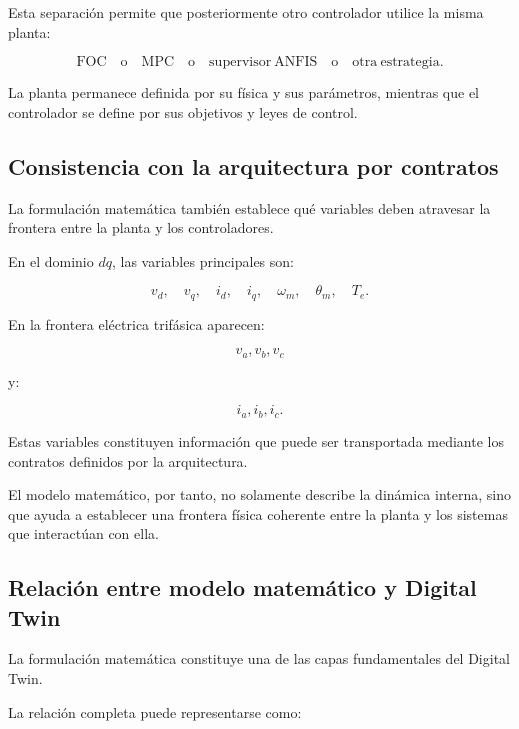 Esta separación permite que posteriormente otro controlador utilice la misma planta:

\begin{equation}
\mathrm{FOC}
\quad\text{o}\quad
\mathrm{MPC}
\quad\text{o}\quad
\mathrm{supervisor\ ANFIS}
\quad\text{o}\quad
\mathrm{otra\ estrategia}.
\end{equation}

La planta permanece definida por su física y sus parámetros, mientras que el controlador se define por sus objetivos y leyes de control.

\subsection{Consistencia con la arquitectura por contratos}

La formulación matemática también establece qué variables deben atravesar la frontera entre la planta y los controladores.

En el dominio $dq$, las variables principales son:

\begin{equation}
v_d,\quad
v_q,\quad
i_d,\quad
i_q,\quad
\omega_m,\quad
\theta_m,\quad
T_e.
\end{equation}

En la frontera eléctrica trifásica aparecen:

\begin{equation}
v_a,v_b,v_c
\end{equation}

y:

\begin{equation}
i_a,i_b,i_c.
\end{equation}

Estas variables constituyen información que puede ser transportada mediante los contratos definidos por la arquitectura.

El modelo matemático, por tanto, no solamente describe la dinámica interna, sino que ayuda a establecer una frontera física coherente entre la planta y los sistemas que interactúan con ella.

\subsection{Relación entre modelo matemático y Digital Twin}

La formulación matemática constituye una de las capas fundamentales del Digital Twin.

La relación completa puede representarse como:

